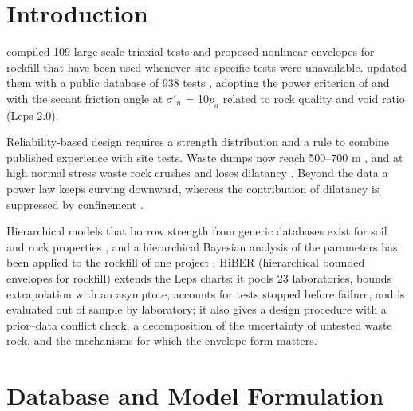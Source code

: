 \documentclass[Journal,letterpaper]{ascelike-new}
\begin{document}

\section{Introduction}
 compiled 109 large-scale triaxial tests and proposed nonlinear envelopes for rockfill that have been used whenever site-specific tests were unavailable.  updated them with a public database of 938 tests \cite{arrieta2025}, adopting the power criterion of  and  with the secant friction angle at $\sigma'_n$ = 10$p_a$ related to rock quality and void ratio (Leps 2.0).

Reliability-based design \cite{read2009,hawley2017} requires a strength distribution and a rule to combine published experience with site tests. Waste dumps now reach 500--700 m \cite{valenzuela2008,bard2011}, and at high normal stress waste rock crushes and loses dilatancy \cite{marsal1973,hardin1985,indraratna1993,linero2007,xiao2014a,xiao2014b,ovalle2020,ventini2021}. Beyond the data a power law keeps curving downward, whereas the contribution of dilatancy is suppressed by confinement \cite{bolton1986,jefferies2016}.

Hierarchical models that borrow strength from generic databases exist for soil and rock properties \cite{ching2019,ching2020,bozorgzadeh2019,ching2021}, and a hierarchical Bayesian analysis of the  parameters has been applied to the rockfill of one project \cite{contreras2022,contreras2025}. HiBER (hierarchical bounded envelopes for rockfill) extends the Leps charts: it pools 23 laboratories, bounds extrapolation with an asymptote, accounts for tests stopped before failure, and is evaluated out of sample by laboratory; it also gives a design procedure with a prior--data conflict check, a decomposition of the uncertainty of untested waste rock, and the mechanisms for which the envelope form matters.

\section{Database and Model Formulation}
\end{document}
